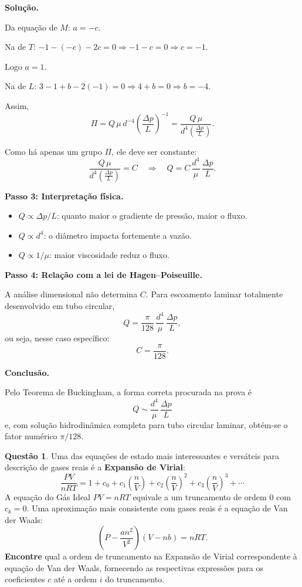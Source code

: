 \documentclass[12pt,a4paper]{article}
\theoremstyle{definition}
\newtheorem{questao}{Quest\~ao}
\newenvironment{solucao}{%
  \par\medskip\noindent\textbf{Solu\c{c}\~ao.}\quad\ignorespaces
}{%
  \par\medskip
}
\begin{document}
\begin{solucao}
Da equa\c{c}\~ao de $M$: $a=-c$.

Na de $T$: $-1-(-c)-2c=0 \Rightarrow -1-c=0 \Rightarrow c=-1$.

Logo $a=1$.

Na de $L$: $3-1+b-2(-1)=0 \Rightarrow 4+b=0 \Rightarrow b=-4$.

Assim,
\[
\Pi = Q\,\mu\,d^{-4}\left(\frac{\Delta p}{L}\right)^{-1}
= \frac{Q\,\mu}{d^4\left(\frac{\Delta p}{L}\right)}.
\]

Como h\'a apenas um grupo $\Pi$, ele deve ser constante:
\[
\frac{Q\,\mu}{d^4\left(\frac{\Delta p}{L}\right)} = C
\quad\Longrightarrow\quad
\boxed{Q = C\,\frac{d^4}{\mu}\,\frac{\Delta p}{L}.}
\]

\medskip
\noindent\textbf{Passo 3: Interpreta\c{c}\~ao f\'isica.}

\begin{itemize}
  \item $Q \propto \Delta p/L$: quanto maior o gradiente de press\~ao, maior o fluxo.
  \item $Q \propto d^4$: o di\^ametro impacta fortemente a vaz\~ao.
  \item $Q \propto 1/\mu$: maior viscosidade reduz o fluxo.
\end{itemize}

\medskip
\noindent\textbf{Passo 4: Rela\c{c}\~ao com a lei de Hagen--Poiseuille.}

A an\'alise dimensional n\~ao determina $C$. Para escoamento laminar totalmente desenvolvido em tubo circular,
\[
Q = \frac{\pi}{128}\,\frac{d^4}{\mu}\,\frac{\Delta p}{L},
\]
ou seja, nesse caso espec\'ifico:
\[
\boxed{C=\frac{\pi}{128}.}
\]

\medskip
\noindent\textbf{Conclus\~ao.}

Pelo Teorema de Buckingham, a forma correta procurada na prova \'e
\[
\boxed{Q \sim \frac{d^4}{\mu}\,\frac{\Delta p}{L}}
\]
e, com solu\c{c}\~ao hidrodin\^amica completa para tubo circular laminar, obt\'em-se o fator num\'erico $\pi/128$.

\end{solucao}

\begin{questao}
Uma das equa\c{c}\~oes de estado mais interessantes e vers\'ateis para descri\c{c}\~ao de gases reais \'e a \textbf{Expans\~ao de Virial}:
\[
  \frac{PV}{nRT} = 1 + c_0 + c_1\!\left(\frac{n}{V}\right) + c_2\!\left(\frac{n}{V}\right)^{\!2} + c_3\!\left(\frac{n}{V}\right)^{\!3} + \cdots
\]
A equa\c{c}\~ao do G\'as Ideal $PV = nRT$ equivale a um truncamento de ordem 0 com $c_k = 0$.
Uma aproxima\c{c}\~ao mais consistente com gases reais \'e a equa\c{c}\~ao de Van der Waals:
\[
  \left(P - \frac{an^2}{V^2}\right)(V - nb) = nRT.
\]
\textbf{Encontre} qual a ordem de truncamento na Expans\~ao de Virial correspondente \`a equa\c{c}\~ao de Van der Waals, fornecendo as respectivas express\~oes para os coeficientes $c$ at\'e a ordem $i$ do truncamento.
\end{questao}
\end{document}
